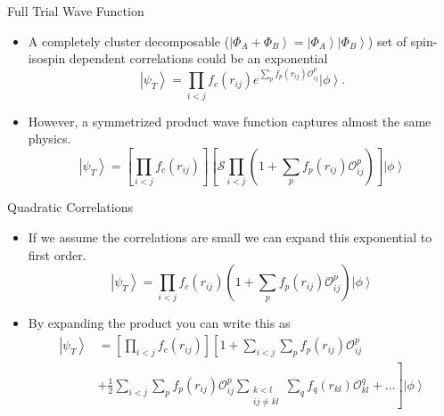 \documentclass{beamer}
\newcommand{\ket}[1]{\left| #1 \right>}
\newcommand{\fpij}{f_p(r_{ij})}
\newcommand{\Opij}{\mathcal{O}_{ij}^p}
\newcommand{\fOpij}{\sum\limits_{i<j}\sum\limits_p \fpij\Opij}
\newcommand{\fqkl}{f_q(r_{kl})}
\newcommand{\Oqkl}{\mathcal{O}_{kl}^q}
\newcommand{\fOqklquad}{\sum_{\substack{k<l\\ij \ne kl}}\sum\limits_q \fqkl\Oqkl}
\begin{document}
\begin{frame}{Full Trial Wave Function}
\begin{itemize}
   \item A completely cluster decomposable ($\ket{\Phi_A+\Phi_B} = \ket{\Phi_A}\ket{\Phi_B}$) set of spin-isospin dependent correlations could be an exponential
   \begin{equation*}
       \ket{\psi_T} = \prod\limits_{i<j}f_c(r_{ij}) e^{\sum\limits_p\fpij\Opij} \ket{\phi}.
   \end{equation*}
   \item However, a symmetrized product wave function captures almost the same physics.
   \begin{equation*}
      \ket{\psi_T} = \left[\prod\limits_{i<j}f_c(r_{ij})\right]\left[\mathcal{S}\prod\limits_{i<j}\left(1+\sum\limits_p \fpij\Opij\right)\right]\ket{\phi}
   \end{equation*}
\end{itemize}
\end{frame}

\begin{frame}{Quadratic Correlations}
\begin{itemize}
   \item If we assume the correlations are small we can expand this exponential to first order.
   \begin{equation*}
      \ket{\psi_T} = \prod\limits_{i<j}f_c(r_{ij}) \left(1+\sum\limits_p\fpij\Opij\right) \ket{\phi}
   \end{equation*}
   \item By expanding the product you can write this as
   \begin{equation*}
   \begin{split}
      \ket{\psi_T} &= \left[\prod\limits_{i<j}f_c(r_{ij})\right] \left[1+\fOpij\right. \\
      & + \left.\frac{1}{2}\fOpij\fOqklquad + \ldots \right] \ket{\phi}
   \end{split}
   \end{equation*}
\end{itemize}
\end{frame}
\end{document}
